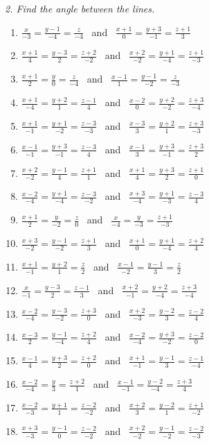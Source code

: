 \emph{2. Find the angle between the lines.}
\bigskip
\begin{enumerate}[label=\arabic*., leftmargin=*]
\item $\frac{x}{-3}=\frac{y-1}{-4}=\frac{z}{-4}$ \ and \ $\frac{x+1}{0}=\frac{y+3}{-1}=\frac{z+1}{3}$
\item $\frac{x+1}{4}=\frac{y-3}{2}=\frac{z+2}{-2}$ \ and \ $\frac{x+2}{-2}=\frac{y+1}{-4}=\frac{z+1}{-3}$
\item $\frac{x+1}{2}=\frac{y}{0}=\frac{z}{-4}$ \ and \ $\frac{x-1}{1}=\frac{y-1}{-2}=\frac{z}{-3}$
\item $\frac{x+1}{-4}=\frac{y+2}{1}=\frac{z-1}{4}$ \ and \ $\frac{x-2}{0}=\frac{y+2}{-2}=\frac{z+3}{-4}$
\item $\frac{x+1}{-1}=\frac{y+1}{-2}=\frac{z-3}{-3}$ \ and \ $\frac{x-3}{3}=\frac{y+2}{1}=\frac{z+3}{-3}$
\item $\frac{x-1}{-1}=\frac{y+3}{-1}=\frac{z-3}{4}$ \ and \ $\frac{x-1}{3}=\frac{y+3}{-1}=\frac{z+3}{2}$
\item $\frac{x+2}{-2}=\frac{y-1}{4}=\frac{z+1}{1}$ \ and \ $\frac{x+1}{4}=\frac{y+3}{2}=\frac{z+1}{0}$
\item $\frac{x-2}{-4}=\frac{y+1}{-4}=\frac{z-3}{-2}$ \ and \ $\frac{x+3}{-4}=\frac{y+1}{-3}=\frac{z-3}{4}$
\item $\frac{x+1}{2}=\frac{y}{-2}=\frac{z}{0}$ \ and \ $\frac{x}{-4}=\frac{y}{-3}=\frac{z+1}{-3}$
\item $\frac{x+3}{-2}=\frac{y-1}{-2}=\frac{z+1}{3}$ \ and \ $\frac{x+1}{0}=\frac{y+1}{-4}=\frac{z+2}{4}$
\item $\frac{x+1}{-1}=\frac{y+2}{1}=\frac{z}{2}$ \ and \ $\frac{x-1}{-2}=\frac{y-1}{3}=\frac{z}{2}$
\item $\frac{x}{-1}=\frac{y-3}{2}=\frac{z-1}{3}$ \ and \ $\frac{x+2}{-1}=\frac{y+2}{-4}=\frac{z+3}{-4}$
\item $\frac{x-2}{-4}=\frac{y-3}{-2}=\frac{z+3}{0}$ \ and \ $\frac{x+2}{-3}=\frac{y-2}{3}=\frac{z-2}{4}$
\item $\frac{x-3}{2}=\frac{y-1}{-4}=\frac{z+2}{4}$ \ and \ $\frac{x-2}{-4}=\frac{y+3}{-2}=\frac{z-2}{0}$
\item $\frac{x-1}{4}=\frac{y+3}{2}=\frac{z+2}{0}$ \ and \ $\frac{x+1}{-1}=\frac{y-1}{3}=\frac{z-1}{-4}$
\item $\frac{x-2}{-4}=\frac{y}{3}=\frac{z+2}{1}$ \ and \ $\frac{x-1}{-1}=\frac{y-2}{-4}=\frac{z+3}{4}$
\item $\frac{x-2}{-3}=\frac{y+1}{1}=\frac{z-2}{-2}$ \ and \ $\frac{x+2}{3}=\frac{y-2}{1}=\frac{z+1}{-2}$
\item $\frac{x+3}{-3}=\frac{y-1}{0}=\frac{z-2}{-2}$ \ and \ $\frac{x+2}{-2}=\frac{y-1}{-2}=\frac{z-2}{-3}$

\end{enumerate}
